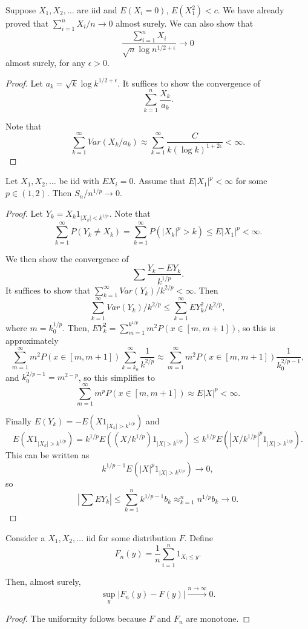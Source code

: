 \documentclass[11pt]{scrartcl}
\begin{document}
\begin{example}
 Suppose $X_1, X_2, \dots$ are iid and $E(X_i = 0)$, $E(X_1^2) < c$.  We have already proved that $\sum_{i=1}^n X_i/n \rightarrow 0$ almost surely.  We can also show that $$\frac{\sum_{i=1}^n X_i}{\sqrt{n} \log{n}^{1/2+\epsilon}} \rightarrow 0$$ almost surely, for any $\epsilon > 0$.
\begin{proof}
 Let $a_k =\sqrt{k} \log{k}^{1/2 + \epsilon}$.  It suffices to show the convergence of 
 $$\sum_{k=1}^n \frac{X_k}{a_k}.$$
 
 Note that 
 $$\sum_{k=1}^{\infty} Var(X_k/a_k) \approx \sum_{k=1}^{\infty} \frac{C}{k(\log k)^{1+2\epsilon}} < \infty.$$

\end{proof}
\end{example}
 \begin{example}
 Let $X_1, X_2, \dots$ be iid with $EX_i = 0$.  Assume that $E|X_1|^p < \infty$ for some $p \in (1, 2)$.    Then
 $S_n/n^{1/p} \rightarrow 0$.  
 \begin{proof}
 Let $Y_k = X_k 1_{|X_k| < k^{1/p}}$.  Note that 
 $$\sum_{k=1}^{\infty} P(Y_k \ne X_k) = \sum_{k=1}^{\infty} P(|X_k|^p > k) \le E|X_1|^p < \infty.$$
 
 We then show the convergence of $$\sum \frac{Y_k - EY_k}{k^{1/p}}.$$ 
 It suffices to show that $\sum_{k=1}^{\infty} Var(Y_k)/k^{2/p} < \infty$.  Then
 $$\sum_{k=1}^{\infty} Var(Y_k)/k^{2/p}  \le \sum_{k=1}^{\infty} EY_k^2/k^{2/p},$$ where $m = k_0^{1/p}$.  Then, $EY_k^2 = \sum_{m=1}^{k^{1/p}} m^2 P(x \in [m, m+1])$, so this is approximately
 $$\sum_{m=1}^{\infty} m^2P(x \in [m, m+1])\sum_{k = k_0}^{\infty}\frac{1}{k^{2/p}} \approx \sum_{m=1}^{\infty} m^2P(x \in [m, m+1]) \frac{1}{k_0^{2/p - 1}},$$
 and $k_0^{2/p - 1} = m^{2-p}$, so this simplifies to 
 $$\sum_{m=1}^{\infty} m^p P(x \in [m, m+1]) \approx E|X|^p < \infty.$$
 
Finally $E(Y_k) = -E(X 1_{|X_k| > k^{1/p}})$ and 
$$E(X 1_{|X_k| > k^{1/p}}) = k^{1/p}E((X/k^{1/p})1_{|X| > k^{1/p}}) \le k^{1/p} E(|X/k^{1/p}|^p 1_{|X| > k^{1/p}}).$$
This can be written as 
$$k^{1/p-1} E(|X|^p 1_{|X| > k^{1/p}}) \rightarrow 0,$$
so 
$$|\sum EY_k| \le \sum_{k=1}^n k^{1/p-1}b_k \approx_{k=1}^n n^{1/p}b_k \rightarrow 0.$$ 
 \end{proof}
 
 \end{example}
\begin{lemma} Consider a $X_1, X_2, \dots$ iid for some distribution $F$.  Define
$$F_n(y) = \frac{1}{n}\sum_{i=1}^n 1_{X_i \le y}.$$

Then, almost surely, $$\sup_y |F_n(y) - F(y)| \xrightarrow{n \rightarrow \infty} 0.$$
\end{lemma}
\begin{proof}
The uniformity follows because $F$ and $F_n$ are monotone.  
\end{proof}
\pagebreak
\end{document}
